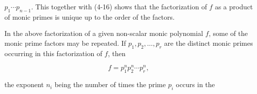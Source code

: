 \(p_{1}\cdots p_{n-1}\). This together with (4-16) shows that the factorization of \(f\) as a product of monic primes is unique up to the order of the factors.

In the above factorization of a given non-scalar monic polynomial \(f\), some of the monic prime factors may be repeated. If \(p_{1},p_{2},\ldots,p_{r}\) are the distinct monic primes occurring in this factorization of \(f\), then

\[f=p_{1}^{n}p_{2}^{n}\cdots p_{r}^{n},\]

the exponent \(n_{i}\) being the number of times the prime \(p_{i}\) occurs in the 
